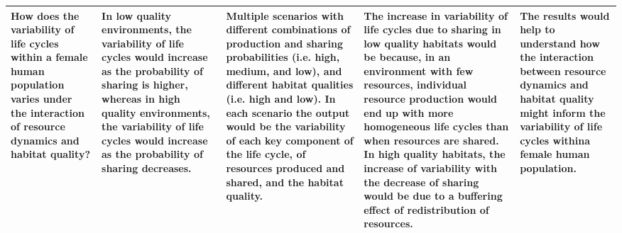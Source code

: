 \documentclass{article}
\begin{document}
\begin{table}[H]
\begin{adjustbox}{width=\textwidth}
\begin{tabular}{p{4cm}p{4cm}p{4cm}p{4cm}p{4cm} }
    How does the variability of life cycles within a female human population varies under the interaction of resource dynamics and habitat quality? & In low quality environments, the variability of life cycles would increase as the probability of sharing is higher, whereas in high quality environments, the variability of life cycles would increase as the probability of sharing decreases. & Multiple scenarios with different combinations of production and sharing probabilities (i.e. high, medium, and low), and different habitat qualities (i.e. high and low). In each scenario the output would be the variability of each key component of the life cycle, of resources produced and shared, and the habitat quality. & The increase in variability of life cycles due to sharing in low quality habitats would be because, in an environment with few resources, individual resource production would end up with more homogeneous life cycles than when resources are shared. In high quality habitats, the increase of variability with the decrease of sharing would be due to a buffering effect of redistribution of resources. & The results would help to understand how the interaction between resource dynamics and habitat quality might inform the variability of life cycles withina female human population.\\
    \hline
    \end{tabular}
    \end{adjustbox}
    \label{tab:1}
\end{table}
\end{document}
